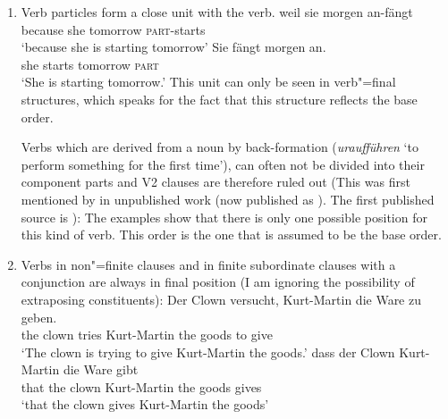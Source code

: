\begin{enumerate}
\item Verb particles form a close unit with the verb.
\eal
\ex 
\gll weil sie morgen an-fängt\\
     because she tomorrow \textsc{part}-starts\\
\glt `because she is starting tomorrow'
\ex 
\gll Sie fängt morgen an.\\
     she starts tomorrow \textsc{part}\\
\glt `She is starting tomorrow.'
\zl
This unit can only be seen in verb"=final structures, which speaks for the fact that this structure
reflects the base order.

Verbs which are derived from a noun by back-formation (\eg \emph{uraufführen} 
`to perform something for the first time'), can often not be divided into their component parts and
V2 clauses are therefore ruled out (This was first mentioned by \citet[]{Hoehle91b} in unpublished
work (now published as ). The first published source is ):
\eal
{}
\zl
The examples show that there is only one possible position for this kind of verb. This order is the one that is assumed to be the base order.
\item Verbs in non"=finite clauses and in finite subordinate clauses with a conjunction are
always in final position (I am ignoring the possibility of extraposing constituents):
\eal
\ex 
\gll Der Clown versucht, Kurt-Martin die Ware zu geben.\\
     the clown tries Kurt-Martin the goods to give\\
\glt `The clown is trying to give Kurt-Martin the goods.'
\ex 
\gll dass der Clown Kurt-Martin die Ware gibt\\
	 that the clown Kurt-Martin the goods gives\\
\glt `that the clown gives Kurt-Martin the goods'
\zl


\end{enumerate}
